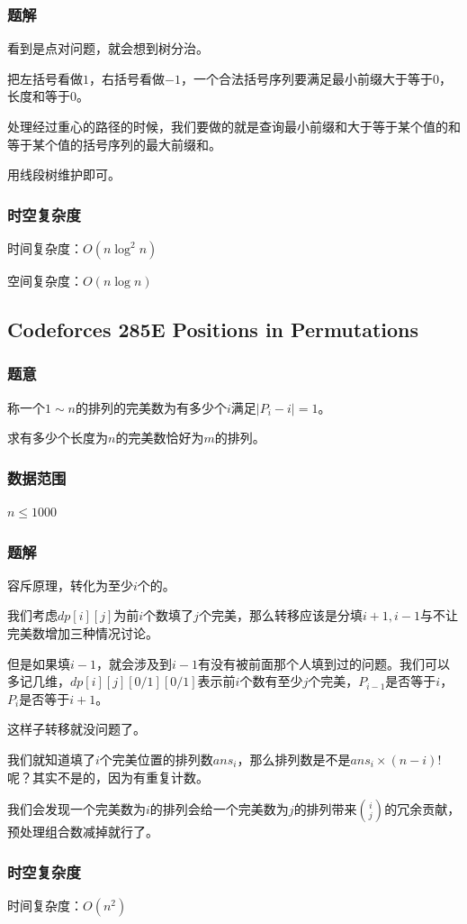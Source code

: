 \documentclass{ctexart}
\begin{document}
\subsubsection{题解}
看到是点对问题，就会想到树分治。

把左括号看做$1$，右括号看做$-1$，一个合法括号序列要满足最小前缀大于等于$0$，长度和等于$0$。

处理经过重心的路径的时候，我们要做的就是查询最小前缀和大于等于某个值的和等于某个值的括号序列的最大前缀和。

用线段树维护即可。
\subsubsection{时空复杂度}
时间复杂度：$O(n \log^2 n)$

空间复杂度：$O(n \log n)$
\subsection{Codeforces 285E Positions in Permutations}
\subsubsection{题意}
称一个$1 \sim n$的排列的完美数为有多少个$i$满足$|P_i-i|=1$。

求有多少个长度为$n$的完美数恰好为$m$的排列。
\subsubsection{数据范围}
$n \le 1000$
\subsubsection{题解}
容斥原理，转化为至少$i$个的。

我们考虑$dp[i][j]$为前$i$个数填了$j$个完美，那么转移应该是分填$i+1,i-1$与不让完美数增加三种情况讨论。

但是如果填$i-1$，就会涉及到$i-1$有没有被前面那个人填到过的问题。我们可以多记几维，$dp[i][j][0/1][0/1]$表示前$i$个数有至少$j$个完美，$P_{i-1}$是否等于$i$，$P_i$是否等于$i+1$。

这样子转移就没问题了。

我们就知道填了$i$个完美位置的排列数$ans_i$，那么排列数是不是$ans_i \times (n-i)!$呢？其实不是的，因为有重复计数。

我们会发现一个完美数为$i$的排列会给一个完美数为$j$的排列带来${i \choose j}$的冗余贡献，预处理组合数减掉就行了。
\subsubsection{时空复杂度}
时间复杂度：$O(n^2)$
\end{document}
